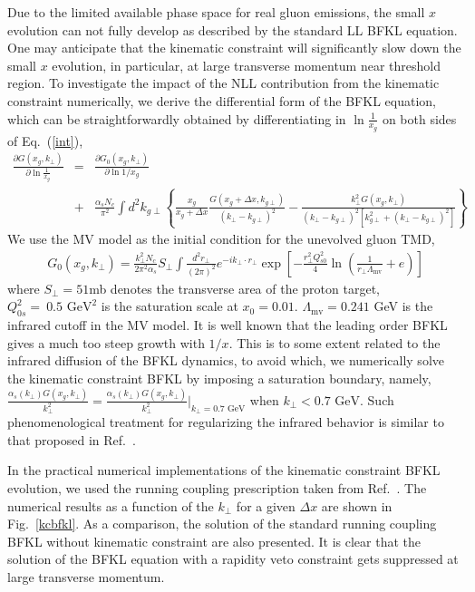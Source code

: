 \documentclass[prd,aps,preprint,tightenlines,nofootinbib,superscriptaddress]{revtex4}
\begin{document}
Due to the limited available phase space for real gluon emissions,   the small $x $ evolution can not  fully develop as described by the standard LL BFKL equation.   One may anticipate that the kinematic constraint will significantly slow down   the small $x$  evolution, in particular, at large transverse momentum near threshold region. To investigate the impact of the NLL contribution from the kinematic constraint numerically, we derive the differential form of the BFKL equation, which can be straightforwardly obtained by  differentiating in $\ln \frac{1}{x_g}$ on both sides of Eq.~(\ref{int}),
\begin{eqnarray}
 \!\!\! \frac{\partial  G(x_g,k_{\perp})}{\partial \ln \frac{1}{x_g}} \!\!\!&=&\!\! \frac{\partial G_0(x_g,k_{\perp})}{\partial \ln 1/x_g}
  \\ &+&\frac{ \alpha_s N_c}{\pi^2} \!\! \int \!\! d^2 k_{g\perp} \!\! \left \{  \frac{x_g}{x_g\!+\Delta x}   \frac{  G(x_g\!+\Delta x,k_{g\perp})}{(k_\perp\!-k_{g\perp})^2}  -  \frac{k_\perp^2  G(x_g,k_{\perp})}{(k_\perp\!  -k_{g\perp})^2 \left [k_{g\perp}^2+(k_\perp\!-k_{g\perp})^2\right ]  
 }   \right \} \nonumber 
\end{eqnarray}
We use the MV model as the initial condition for the unevolved  gluon  TMD,
\begin{eqnarray}
 G_0(x_g,k_{\perp})=\frac{k_\perp^2N_c}{2\pi^2 \alpha_s }S_\perp \int \frac{d^2 r_\perp}{(2\pi)^2} e^{-ik_\perp \cdot r_\perp} \exp \left [-\frac{r_\perp^2 Q_{s0}^2}{4}\ln\left( \frac{1}{r_\perp \Lambda_{\text{mv}}}+e \right ) \right ]
\end{eqnarray}
where $S_\perp= 51$mb denotes the transverse area of the proton target, $Q_{0s}^2= \ 0.5 {\text{ GeV}}^2$ is the saturation scale at $x_0=0.01$.  $\Lambda_\text{mv}=0.241$ GeV is the infrared cutoff in the MV model. It is well known that the leading order BFKL gives a much too steep growth with $1/x$. This is to some extent related to the infrared diffusion of the BFKL dynamics, to avoid which, we numerically solve the kinematic constraint BFKL by imposing a saturation boundary, namely,  $\frac{\alpha_s(k_\perp) G(x_g,k_{\perp})}{k_\perp^2}=\frac{\alpha_s(k_\perp) G(x_g,k_\perp)}{k_\perp^2}|_{k_{\perp}=0.7 \text{ GeV}}$  when $k_\perp <0.7 \text{ GeV}$. Such phenomenological treatment for regularizing the infrared behavior is similar to that  proposed in Ref.~\cite{Avsar:2011ds}.

In the practical numerical implementations of the kinematic constraint BFKL evolution, we  used the running coupling prescription taken from Ref.~\cite{Kovchegov:2006wf}.
The numerical results  as a function of the $k_\perp$ for a given  $\Delta x$ are shown  in Fig.~\ref{kcbfkl}. As a comparison, the solution of the standard running coupling BFKL without kinematic constraint are also presented.  It is clear that the solution of the BFKL equation with a rapidity veto constraint gets suppressed  at large transverse momentum. 
\end{document}
